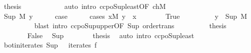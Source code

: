 \begin{isabellebody}
\ {\isacharquery}{\kern0pt}thesis\isanewline
\ \ \ \ \ \ \ \ \ \ \isamarkupfalse%
\ {\isacharparenleft}{\kern0pt}auto\ intro{\isacharcolon}{\kern0pt}\ ccpo{\isacharunderscore}{\kern0pt}Sup{\isacharunderscore}{\kern0pt}least{\isacharbrackleft}{\kern0pt}OF\ chM{\isacharbrackright}{\kern0pt}{\isacharparenright}{\kern0pt}\isanewline
\ \ \ \ \ \ \isamarkupfalse%
\isanewline
\ \ \ \ \isamarkupfalse%
\isanewline
\ \ \isamarkupfalse%
\isanewline
\ \ \ \ \isamarkupfalse%
\ {\isacharparenleft}{\kern0pt}Sup\ M\ y{\isacharparenright}{\kern0pt}\isanewline
\ \ \ \ \isamarkupfalse%
\ {\isacharquery}{\kern0pt}case\isanewline
\ \ \ \ \isamarkupfalse%
\ {\isacharparenleft}{\kern0pt}cases\ {\isachardoublequoteopen}{\isasymexists}x{\isasymin}M{\isachardot}{\kern0pt}\ y\ {\isasymle}\ x{\isachardoublequoteclose}{\isacharparenright}{\kern0pt}\isanewline
\ \ \ \ \ \ \isamarkupfalse%
\ True\isanewline
\ \ \ \ \ \ \isamarkupfalse%
\ \isamarkupfalse%
\ {\isachardoublequoteopen}y\ {\isasymle}\ Sup\ M{\isachardoublequoteclose}\isanewline
\ \ \ \ \ \ \ \ \isamarkupfalse%
\ {\isacharparenleft}{\kern0pt}blast\ intro{\isacharcolon}{\kern0pt}\ ccpo{\isacharunderscore}{\kern0pt}Sup{\isacharunderscore}{\kern0pt}upper{\isacharbrackleft}{\kern0pt}OF\ Sup{\isacharparenleft}{\kern0pt}{}{\isacharparenright}{\kern0pt}{\isacharbrackright}{\kern0pt}\ order{\isacharunderscore}{\kern0pt}trans{\isacharparenright}{\kern0pt}\isanewline
\ \ \ \ \ \ \isamarkupfalse%
\ \isamarkupfalse%
\ {\isacharquery}{\kern0pt}thesis\ \isacommand{{\isachardot}{\kern0pt}{\isachardot}{\kern0pt}}\isamarkupfalse%
\isanewline
\ \ \ \ \isamarkupfalse%
\isanewline
\ \ \ \ \ \ \isamarkupfalse%
\ False\ \isamarkupfalse%
\ Sup\isanewline
\ \ \ \ \ \ \isamarkupfalse%
\ {\isacharquery}{\kern0pt}thesis\ \isamarkupfalse%
\ {\isacharparenleft}{\kern0pt}auto\ intro{\isacharcolon}{\kern0pt}\ ccpo{\isacharunderscore}{\kern0pt}Sup{\isacharunderscore}{\kern0pt}least{\isacharparenright}{\kern0pt}\isanewline
\ \ \ \ \isamarkupfalse%
\isanewline
\ \ \isamarkupfalse%
\isanewline
{}\isamarkupfalse%
%
\endisatagproof
{\isafoldproof}%
%
\isadelimproof
\isanewline
%
\endisadelimproof
\isanewline
{}\isamarkupfalse%
\ bot{\isacharunderscore}{\kern0pt}in{\isacharunderscore}{\kern0pt}iterates{\isacharcolon}{\kern0pt}\ {\isachardoublequoteopen}Sup\ {\isacharbraceleft}{\kern0pt}{\isacharbraceright}{\kern0pt}\ {\isasymin}\ iterates\ f{\isachardoublequoteclose}\isanewline

\end{isabellebody}
